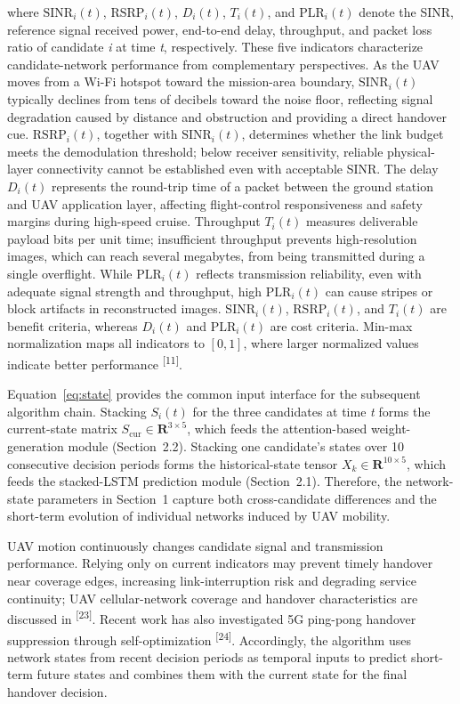 \documentclass[10pt,a4paper]{article}
\newcommand{\upcite}[1]{\textsuperscript{[#1]}}
\begin{document}
where $\mathrm{SINR}_i(t)$, $\mathrm{RSRP}_i(t)$, $D_i(t)$, $T_i(t)$, and $\mathrm{PLR}_i(t)$ denote the SINR, reference signal received power, end-to-end delay, throughput, and packet loss ratio of candidate \textit{i} at time \textit{t}, respectively. These five indicators characterize candidate-network performance from complementary perspectives. As the UAV moves from a Wi-Fi hotspot toward the mission-area boundary, $\mathrm{SINR}_i(t)$ typically declines from tens of decibels toward the noise floor, reflecting signal degradation caused by distance and obstruction and providing a direct handover cue. $\mathrm{RSRP}_i(t)$, together with $\mathrm{SINR}_i(t)$, determines whether the link budget meets the demodulation threshold; below receiver sensitivity, reliable physical-layer connectivity cannot be established even with acceptable SINR. The delay $D_i(t)$ represents the round-trip time of a packet between the ground station and UAV application layer, affecting flight-control responsiveness and safety margins during high-speed cruise. Throughput $T_i(t)$ measures deliverable payload bits per unit time; insufficient throughput prevents high-resolution images, which can reach several megabytes, from being transmitted during a single overflight. While $\mathrm{PLR}_i(t)$ reflects transmission reliability, even with adequate signal strength and throughput, high $\mathrm{PLR}_i(t)$ can cause stripes or block artifacts in reconstructed images. $\mathrm{SINR}_i(t)$, $\mathrm{RSRP}_i(t)$, and $T_i(t)$ are benefit criteria, whereas $D_i(t)$ and $\mathrm{PLR}_i(t)$ are cost criteria. Min-max normalization maps all indicators to $[0,1]$, where larger normalized values indicate better performance \upcite{11}.

Equation~\eqref{eq:state} provides the common input interface for the subsequent algorithm chain. Stacking $S_i(t)$ for the three candidates at time \textit{t} forms the current-state matrix $S_{\mathrm{cur}}\in\mathbf{R}^{3\times5}$, which feeds the attention-based weight-generation module (Section~2.2). Stacking one candidate's states over 10 consecutive decision periods forms the historical-state tensor $X_k\in\mathbf{R}^{10\times5}$, which feeds the stacked-LSTM prediction module (Section~2.1). Therefore, the network-state parameters in Section~1 capture both cross-candidate differences and the short-term evolution of individual networks induced by UAV mobility.

UAV motion continuously changes candidate signal and transmission performance. Relying only on current indicators may prevent timely handover near coverage edges, increasing link-interruption risk and degrading service continuity; UAV cellular-network coverage and handover characteristics are discussed in \upcite{23}. Recent work has also investigated 5G ping-pong handover suppression through self-optimization \upcite{24}. Accordingly, the algorithm uses network states from recent decision periods as temporal inputs to predict short-term future states and combines them with the current state for the final handover decision.
\end{document}
